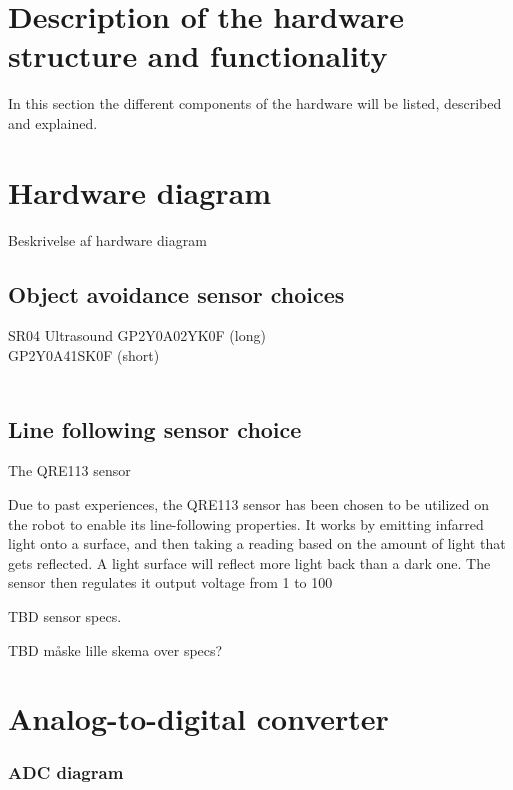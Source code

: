 \section{Description of the hardware structure and functionality}

In this section the different components of the hardware will be listed, described and explained.

\section{Hardware diagram}
Beskrivelse af hardware diagram


\subsection{Object avoidance sensor choices}
SR04 Ultrasound
GP2Y0A02YK0F (long) \\	
GP2Y0A41SK0F (short) \\
\\
\subsection{Line following sensor choice} 

The QRE113 sensor

Due to past experiences, the QRE113 sensor has been chosen to be utilized on the robot to enable its line-following properties. It works by emitting infarred light onto a surface, and then taking a reading based on the amount of light that gets reflected. A light surface will reflect more light back than a dark one. The sensor then regulates it output voltage from 1 to 100%

TBD sensor specs.\

TBD måske lille skema over specs?

\section{Analog-to-digital converter}


\subsubsection{ADC diagram} 

